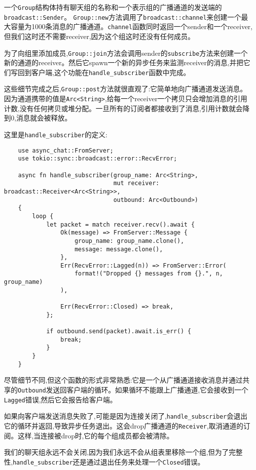 一个\texttt{Group}结构体持有聊天组的名称和一个表示组的广播通道的发送端的\texttt{broadcast::Sender}。 \texttt{Group::new}方法调用了\texttt{broadcast::channel}来创建一个最大容量为1000条消息的广播通道。\texttt{channel}函数同时返回一个sender和一个receiver,但我们这时还不需要receiver,因为这个组这时还没有任何成员。

为了向组里添加成员,\texttt{Group::join}方法会调用sender的\texttt{subscribe}方法来创建一个新的通道的receiver。然后它spawn一个新的异步任务来监测receiver的消息,并把它们写回到客户端,这个功能在\texttt{handle\_subscriber}函数中完成。

这些细节完成之后,\texttt{Group::post}方法就很直观了:它简单地向广播通道发送消息。因为通道携带的值是\texttt{Arc<String>},给每一个receiver一个拷贝只会增加消息的引用计数,没有任何拷贝或堆分配。一旦所有的订阅者都接收到了消息,引用计数就会降到0,消息就会被释放。

这里是\texttt{handle\_subscriber}的定义:
\begin{verbatim}
    use async_chat::FromServer;
    use tokio::sync::broadcast::error::RecvError;

    async fn handle_subscriber(group_name: Arc<String>,
                               mut receiver: broadcast::Receiver<Arc<String>>,
                               outbound: Arc<Outbound>)
    {
        loop {
            let packet = match receiver.recv().await {
                Ok(message) => FromServer::Message {
                    group_name: group_name.clone(),
                    message: message.clone(),
                },
                Err(RecvError::Lagged(n)) => FromServer::Error(
                    format!("Dropped {} messages from {}.", n, group_name)
                ),

                Err(RecvError::Closed) => break,
            };

            if outbound.send(packet).await.is_err() {
                break; 
            }
        }
    }
\end{verbatim}

尽管细节不同,但这个函数的形式非常熟悉:它是一个从广播通道接收消息并通过共享的\texttt{Outbound}发送回客户端的循环。如果循环不能跟上广播通道,它会接收到一个\texttt{Lagged}错误,然后它会报告给客户端。

如果向客户端发送消息失败了,可能是因为连接关闭了,\texttt{handle\_subscriber}会退出它的循环并返回,导致异步任务退出。这会drop广播通道的\texttt{Receiver},取消通道的订阅。这样,当连接被drop时,它的每个组成员都会被清除。

我们的聊天组永远不会关闭,因为我们永远不会从组表里移除一个组,但为了完整性,\texttt{handle\_subscriber}还是通过退出任务来处理一个\texttt{Closed}错误。

